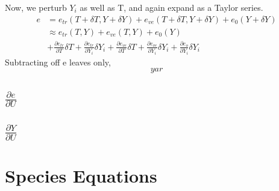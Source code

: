 \documentclass[10pt]{article}
\newcommand{\myred}[1]{{\color{red} #1}}
\begin{document}
Now, we perturb $Y_i$ as well as T, and again expand as a Taylor
series. 
\begin{align}
 e &= e_{tr}(T+\delta T, Y + \delta Y ) + e_{ve}(T+\delta T, Y + \delta Y ) + e_{0}(Y + \delta Y) \\
 &\approx e_{tr}(T,Y) +  e_{ve}(T,Y) + e_{0}(Y) \\
 & + \frac{\partial e_{tr}}{\partial T} \delta T + \frac{\partial e_{tr}}{\partial Y_i} \delta Y_i
   + \frac{\partial e_{ve}}{\partial T} \delta T + \frac{\partial e_{ve}}{\partial Y_i} \delta Y_i 
   + \frac{\partial e_{o}}{\partial Y_i} \delta Y_i 
\end{align}
Subtracting off e leaves only,
\begin{equation}
yar
\end{equation}


%
% 
%
\subsection{$\frac{\partial e}{\partial U}$}

%
% 
%
\subsection{$\frac{\partial Y}{\partial U}$}



\section{Species Equations}
\end{document}
